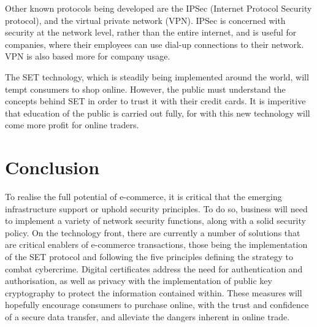 \documentclass[11pt,a4paper,twoside,notitlepage]{article}
\begin{document}
Other known protocols being developed are the 
IPSec (Internet Protocol Security protocol), and the virtual private network (VPN). 
IPSec is concerned with security at the network level, rather than the entire internet, and is useful for companies, where their employees can use dial-up connections to their network.
VPN is also based more for company usage.

The SET technology, which is steadily being implemented around the world, will tempt consumers to shop online.  However, the public must understand the concepts behind SET in order to trust it with their credit cards.  It is imperitive that education of the public is carried out fully, for with this new technology will come more profit for online traders.


\section*{Conclusion}
To realise the full potential of e-commerce, it is critical that the emerging infrastructure support or 
uphold security principles.
To do so, business will need to implement a variety of network security functions, along with a solid security
policy.
On the technology front, there are currently a number of solutions that are critical enablers of e-commerce
transactions, those being the implementation of the SET protocol and following the five
principles defining the strategy to combat cybercrime.
Digital certificates address the need for authentication and authorisation, as well as privacy with the implementation
of public key cryptography to protect the information contained within.
These measures will hopefully encourage consumers to purchase online, with the trust and confidence of a secure data transfer, and alleviate the dangers inherent in online trade.



\end{document}
